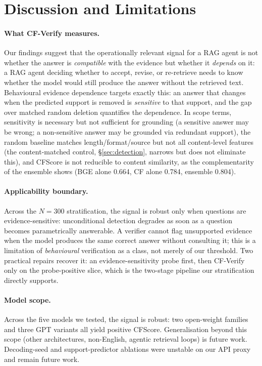 \documentclass[11pt]{article}
\begin{document}
\section{Discussion and Limitations}
\label{sec:discussion}

\paragraph{What CF-Verify measures.}
Our findings suggest that the operationally relevant signal for a RAG agent is not whether the answer is \emph{compatible} with the evidence but whether it \emph{depends} on it: a RAG agent deciding whether to accept, revise, or re-retrieve needs to know whether the model would still produce the answer without the retrieved text. Behavioural evidence dependence targets exactly this: an answer that changes when the predicted support is removed is \emph{sensitive} to that support, and the gap over matched random deletion quantifies the dependence. In scope terms, sensitivity is necessary but not sufficient for grounding (a sensitive answer may be wrong; a non-sensitive answer may be grounded via redundant support), the random baseline matches length/format/source but not all content-level features (the content-matched control, §\ref{sec:detection}, narrows but does not eliminate this), and CFScore is not reducible to content similarity, as the complementarity of the ensemble shows (BGE alone 0.664, CF alone 0.784, ensemble 0.804).

\paragraph{Applicability boundary.}
Across the $N{=}300$ stratification, the signal is robust only when questions are evidence-sensitive: unconditional detection degrades as soon as a question becomes parametrically answerable. A verifier cannot flag unsupported evidence when the model produces the same correct answer without consulting it; this is a limitation of \emph{behavioural} verification as a class, not merely of our threshold. Two practical repairs recover it: an evidence-sensitivity probe first, then CF-Verify only on the probe-positive slice, which is the two-stage pipeline our stratification directly supports.

\paragraph{Model scope.}
Across the five models we tested, the signal is robust: two open-weight families and three GPT variants all yield positive CFScore. Generalisation beyond this scope (other architectures, non-English, agentic retrieval loops) is future work. Decoding-seed and support-predictor ablations were unstable on our API proxy and remain future work.
\end{document}
